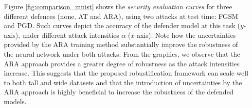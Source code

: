 Figure \ref{fig:comparison_mnist} shows the \emph{security evaluation curves} \cite{BIGGIO2018317} for three different defences (none, AT and ARA), using two attacks at test time: FGSM and PGD. Such curves depict the accuracy of the defender model at this task ($y$-axis), under different attack intensities $\alpha$ ($x$-axis). Note how the uncertainties provided by the ARA training method substantially improve the robustness of the neural network under both attacks. From the graphics, we observe that the ARA approach provides a greater degree of robustness as the attack intensities increase. This suggests that the proposed robustification framework can scale well to both tall and wide datasets and that the introduction of uncertainties by the ARA approach is highly beneficial to increase the robustness of the defended models.



